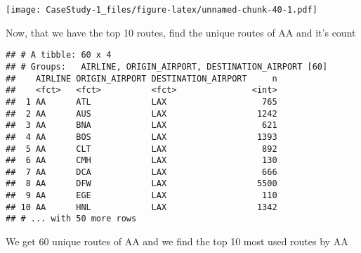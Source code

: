 \documentclass[]{article}
\newenvironment{Shaded}{\begin{snugshade}}{\end{snugshade}}
\newcommand{\DecValTok}[1]{\textcolor[rgb]{0.00,0.00,0.81}{#1}}
\newcommand{\KeywordTok}[1]{\textcolor[rgb]{0.13,0.29,0.53}{\textbf{#1}}}
\newcommand{\NormalTok}[1]{#1}
\newcommand{\OperatorTok}[1]{\textcolor[rgb]{0.81,0.36,0.00}{\textbf{#1}}}
\newcommand{\StringTok}[1]{\textcolor[rgb]{0.31,0.60,0.02}{#1}}
\begin{document}
\texttt{[image: CaseStudy-1\_files/figure-latex/unnamed-chunk-40-1.pdf]}

Now, that we have the top 10 routes, find the unique routes of AA and
it's count

\begin{Shaded}
\end{Shaded}

\begin{verbatim}
## # A tibble: 60 x 4
## # Groups:   AIRLINE, ORIGIN_AIRPORT, DESTINATION_AIRPORT [60]
##    AIRLINE ORIGIN_AIRPORT DESTINATION_AIRPORT     n
##    <fct>   <fct>          <fct>               <int>
##  1 AA      ATL            LAX                   765
##  2 AA      AUS            LAX                  1242
##  3 AA      BNA            LAX                   621
##  4 AA      BOS            LAX                  1393
##  5 AA      CLT            LAX                   892
##  6 AA      CMH            LAX                   130
##  7 AA      DCA            LAX                   666
##  8 AA      DFW            LAX                  5500
##  9 AA      EGE            LAX                   110
## 10 AA      HNL            LAX                  1342
## # ... with 50 more rows
\end{verbatim}

We get 60 unique routes of AA and we find the top 10 most used routes by
AA

\begin{Shaded}
\end{Shaded}
\end{document}
